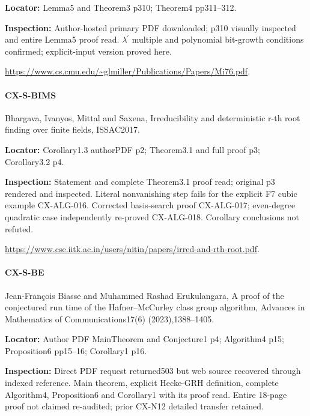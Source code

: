 \documentclass[11pt,a4paper]{article}
\begin{document}
\textbf{Locator:} Lemma5 and Theorem3 p310; Theorem4 pp311–\allowbreak{}312.

\textbf{Inspection:} Author-hosted primary PDF downloaded; p310 visually inspected and entire Lemma5 proof read.\allowbreak{} \ensuremath{\lambda}\ensuremath{{}^{\prime}} multiple and polynomial bit-growth conditions confirmed; explicit-input version proved here.\allowbreak{}

\url{https://www.cs.cmu.edu/~glmiller/Publications/Papers/Mi76.pdf}.

\paragraph{CX-S-BIMS} Bhargava, Ivanyos, Mittal and Saxena, Irreducibility and deterministic r-th root finding over finite fields, ISSAC2017.

\textbf{Locator:} Corollary1.\allowbreak{}3 authorPDF p2; Theorem3.\allowbreak{}1 and full proof p3; Corollary3.\allowbreak{}2 p4.

\textbf{Inspection:} Statement and complete Theorem3.\allowbreak{}1 proof read; original p3 rendered and inspected.\allowbreak{} Literal nonvanishing step fails for the explicit F7 cubic example CX-ALG-016.\allowbreak{} Corrected basis-search proof CX-ALG-017; even-degree quadratic case independently re-proved CX-ALG-018.\allowbreak{} Corollary conclusions not refuted.\allowbreak{}

\url{https://www.cse.iitk.ac.in/users/nitin/papers/irred-and-rth-root.pdf}.

\paragraph{CX-S-BE} Jean-François Biasse and Muhammed Rashad Erukulangara, A proof of the conjectured run time of the Hafner–\allowbreak{}McCurley class group algorithm, Advances in Mathematics of Communications17(6) (2023),1388–\allowbreak{}1405.

\textbf{Locator:} Author PDF MainTheorem and Conjecture1 p4; Algorithm4 p15; Proposition6 pp15–\allowbreak{}16; Corollary1 p16.

\textbf{Inspection:} Direct PDF request returned503 but web source recovered through indexed reference.\allowbreak{} Main theorem, explicit Hecke-GRH definition, complete Algorithm4, Proposition6 and Corollary1 with its proof read.\allowbreak{} Entire 18-page proof not claimed re-audited; prior CX-N12 detailed transfer retained.\allowbreak{}
\end{document}

